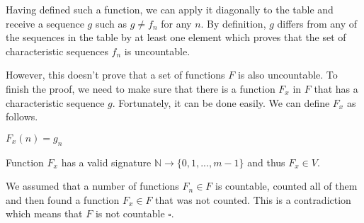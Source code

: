 \documentclass[a4paper, notitlepage]{article}
\begin{document}
Having defined such a function, we can apply it diagonally to the table and receive a sequence $g$ such as $g \neq f_n$ for any $n$. By definition, $g$ differs from any of the sequences in the table by at least one element which proves that the set of characteristic sequences $f_n$ is uncountable.

However, this doesn't prove that a set of functions $F$ is also uncountable. To finish the proof, we need to make sure that there is a function $F_x$ in $F$ that has a characteristic sequence $g$. Fortunately, it can be done easily. We can define $F_x$ as follows.

\begin{center}
\(F_x(n) = g_n\)
\end{center}

Function $F_x$ has a valid signature $\mathbb{N} \rightarrow \{0, 1, ..., m-1\}$ and thus \(F_x \in V\). 

We assumed that a number of functions $F_n \in F$ is countable, counted all of them and then found a function $F_x \in F$ that was not counted. This is a contradiction which means that $F$ is not countable \hfill $\square$.
\end{document}
